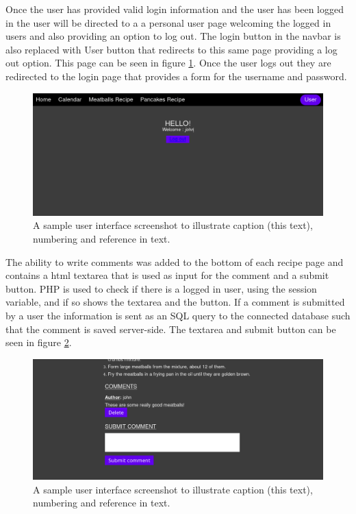 \documentclass[a4paper]{scrartcl}
\begin{document}
Once the user has provided valid login information and the user has been logged in the user will be directed to a a personal user page welcoming the logged in users and also providing an option to log out. The login button in the navbar is also replaced with User button that redirects to this same page providing a log out option. This page can be seen in figure \ref{fig:user_page}. Once the user logs out they are redirected to the login page that provides a form for the username and password. 
\begin{figure}[h!]
  \begin{center}
    \includegraphics[scale=0.3]{images/user_page.png}
    \caption{A sample user interface screenshot to illustrate caption (this text), numbering and reference in text.}
    \label{fig:user_page}
  \end{center}
\end{figure}

The ability to write comments was added to the bottom of each recipe page and contains a html textarea that is used as input for the comment and a submit button. PHP is used to check if there is a logged in user, using the session variable, and if so shows the textarea and the button. If a comment is submitted by a user the information is sent as an SQL query to the connected database such that the comment is saved server-side. The textarea and submit button can be seen in figure \ref{fig:comment_form}. 

\begin{figure}[h!]
  \begin{center}
    \includegraphics[scale=0.3]{images/comment_form.png}
    \caption{A sample user interface screenshot to illustrate caption (this text), numbering and reference in text.}
    \label{fig:comment_form}
  \end{center}
\end{figure}
\end{document}
